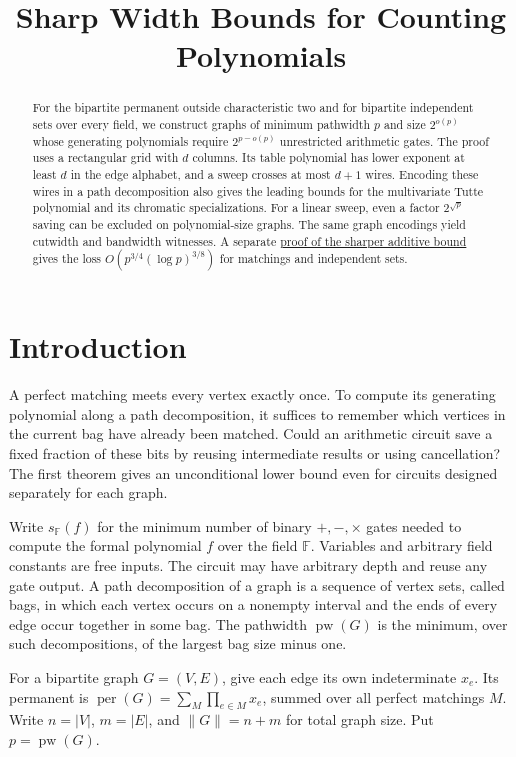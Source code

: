 \documentclass[11pt]{article}
\title{Sharp Width Bounds for Counting Polynomials}
\author{}
\date{}
\theoremstyle{definition}
\newcommand{\F}{\mathbb F}
\newcommand{\pw}{\operatorname{pw}}
\newcommand{\per}{\operatorname{per}}
\begin{document}
\maketitle
\begin{abstract}
For the bipartite permanent outside characteristic two and for bipartite independent sets over every field, we construct graphs of minimum pathwidth \(p\) and size \(2^{o(p)}\) whose generating polynomials require \(2^{p-o(p)}\) unrestricted arithmetic gates. The proof uses a rectangular grid with \(d\) columns. Its table polynomial has lower exponent at least \(d\) in the edge alphabet, and a sweep crosses at most \(d+1\) wires. Encoding these wires in a path decomposition also gives the leading bounds for the multivariate Tutte polynomial and its chromatic specializations. For a linear sweep, even a factor \(2^{\sqrt p}\) saving can be excluded on polynomial-size graphs. The same graph encodings yield cutwidth and bandwidth witnesses. A separate \href{sharper-additive-bound.md}{proof of the sharper additive bound} gives the loss \(O(p^{3/4}(\log p)^{3/8})\) for matchings and independent sets.
\end{abstract}

\section{Introduction}

A perfect matching meets every vertex exactly once. To compute its generating polynomial along a path decomposition, it suffices to remember which vertices in the current bag have already been matched. Could an arithmetic circuit save a fixed fraction of these bits by reusing intermediate results or using cancellation? The first theorem gives an unconditional lower bound even for circuits designed separately for each graph.

Write \(s_{\F}(f)\) for the minimum number of binary \(+,-,\times\) gates needed to compute the formal polynomial \(f\) over the field \(\F\). Variables and arbitrary field constants are free inputs. The circuit may have arbitrary depth and reuse any gate output. A path decomposition of a graph is a sequence of vertex sets, called bags, in which each vertex occurs on a nonempty interval and the ends of every edge occur together in some bag. The pathwidth \(\pw(G)\) is the minimum, over such decompositions, of the largest bag size minus one.

For a bipartite graph \(G=(V,E)\), give each edge its own indeterminate \(x_e\). Its permanent is \(\per(G)=\sum_M\prod_{e\in M}x_e\), summed over all perfect matchings \(M\). Write \(n=|V|\), \(m=|E|\), and \(\|G\|=n+m\) for total graph size. Put \(p=\pw(G)\).
\end{document}
